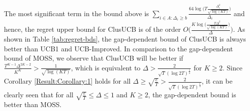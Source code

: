 
The most significant term in the bound above is $\sum_{i\in A:\Delta_{i}\geq b}\frac{64\log{\big(T\frac{\Delta_{i}^{2}}{\sqrt{\log (KT)}}\big)}}{\Delta_{i}}$ and hence, the regret upper bound for ClusUCB is of the order $O\bigg(\frac{K\log \big(\frac{T\Delta^{2}}{\sqrt{\log (KT)}}\big)}{\Delta}\bigg)$. As shown in Table \ref{tab:regret-bds}, the gap-dependent bound of ClusUCB is always better than UCB1 and UCB-Improved. 
%
In comparison to the gap-dependent bound of MOSS, we observe that ClusUCB will be better if 
$\frac{T^{K-1}\Delta^{2K-2}}{K^{K}} > \frac{1}{\sqrt{\log(KT)}}$, which is equivalent to $\Delta > \frac{2}{\sqrt{T}(\log 2T)^{\frac{1}{4}}}$ for
$K\geq 2$. Since Corollary \ref{Result:Corollary:1} holds for all $\Delta \geq \sqrt{\frac{e}{T}} > \frac{2}{\sqrt{T}(\log 2T)^{\frac{1}{4}}}$, it can be clearly seen that for all $\sqrt{\frac{e}{T}} \leq \Delta\leq 1$ and $K\geq 2$, the gap-dependent bound is better than MOSS.

